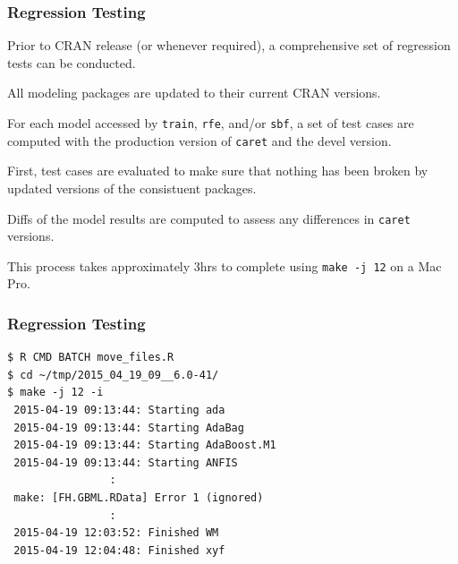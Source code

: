 \documentclass[12 pt]{beamer}\usepackage[]{graphicx}\usepackage[]{color}
\newcommand{\hlkwd}[1]{\textcolor[rgb]{0.78,0.227,0.412}{#1}}%
\newcommand{\mxkwd}[1]{\texttt{\hlkwd{#1}}}%
\newcommand{\pkg}[1]{{\fontseries{b}\selectfont #1}}
\renewcommand{\pkg}[1]{{\color{darkgreen}\texttt{#1}}}
\begin{document}
  \begin{frame}[fragile]
\frametitle{Regression Testing}

Prior to CRAN release (or whenever required), a comprehensive set of regression tests can be  conducted.

\vspace{.1in}

All modeling packages are updated to their current CRAN versions.

\vspace{.1in}

For each model accessed by \mxkwd{train}, \mxkwd{rfe}, and/or \mxkwd{sbf}, a set of test cases are computed with the production version of \pkg{caret} and the devel version.

\vspace{.1in}

First, test cases are evaluated to make sure that nothing has been broken by updated versions of the consistuent packages.

\vspace{.1in}

Diffs of the model results are computed to assess any differences in \pkg{caret} versions.

\vspace{.1in}

This process takes approximately 3hrs to complete using \texttt{make -j 12} on a Mac Pro.

\end{frame}



  \begin{frame}[fragile]
\frametitle{Regression Testing}

\begin{Verbatim}[fontsize=\footnotesize]
$ R CMD BATCH move_files.R
$ cd ~/tmp/2015_04_19_09__6.0-41/
$ make -j 12 -i
 2015-04-19 09:13:44: Starting ada
 2015-04-19 09:13:44: Starting AdaBag
 2015-04-19 09:13:44: Starting AdaBoost.M1
 2015-04-19 09:13:44: Starting ANFIS
                :
 make: [FH.GBML.RData] Error 1 (ignored)
                :
 2015-04-19 12:03:52: Finished WM
 2015-04-19 12:04:48: Finished xyf
\end{Verbatim}

\end{frame}



\end{document}
